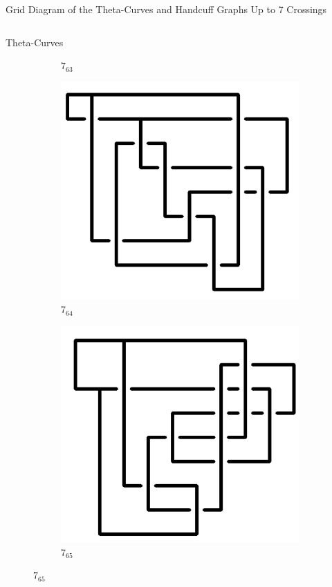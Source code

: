 \documentclass[final]{beamer}
\begin{document}
\begin{frame}[t]
\begin{alertblock}{Grid Diagram of the Theta-Curves and Handcuff Graphs Up to 7 Crossings}
\begin{columns}[t]
\begin{column}{0.5\textwidth}
\begin{alertblock}{Theta-Curves}
\begin{figure}
\begin{subfigure}{0.075\textwidth}
    \caption{$7_{63}$} 
    \end{subfigure}
    \begin{subfigure}{0.075\textwidth}
    \includegraphics[width=\columnwidth]{../Midterm_Poster/grid_diagram/theta_7_64.png}
    \caption{$7_{64}$} 
    \end{subfigure}
    \begin{subfigure}{0.075\textwidth}
    \includegraphics[width=\columnwidth]{../Midterm_Poster/grid_diagram/theta_7_65.png}
    \caption{$7_{65}$} 
    \end{subfigure}
  \end{figure}



\end{alertblock}
\end{column}
\end{columns}
\end{alertblock}
\end{frame}
\end{document}
